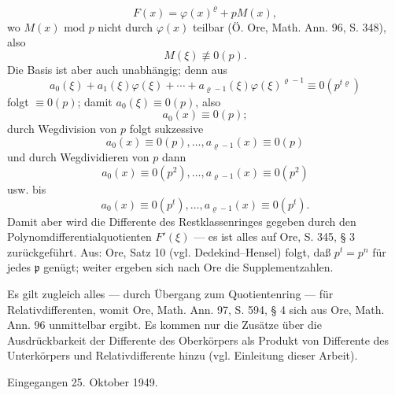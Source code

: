 \[
F(x)=\varphi(x)^\varrho+pM(x),
\]
wo $M(x)$ mod $p$ nicht durch $\varphi(x)$ teilbar (Ö. Ore, Math. Ann. 96, S. 348), also
\[
M(\xi)\not\equiv0(p).
\]
Die Basis ist aber auch unabhängig; denn aus
\[
a_0(\xi)+a_1(\xi)\varphi(\xi)+\cdots+a_{\varrho-1}(\xi)\varphi(\xi)^{\varrho-1}
\equiv0(p^{t\varrho})
\]
folgt $\equiv0(p)$; damit $a_0(\xi)\equiv0(p)$, also
\[
a_0(x)\equiv0(p);
\]
durch Wegdivision von $p$ folgt sukzessive
\[
a_0(x)\equiv0(p),\ldots,a_{\varrho-1}(x)\equiv0(p)
\]
und durch Wegdividieren von $p$ dann
\[
a_0(x)\equiv0(p^2),\ldots,a_{\varrho-1}(x)\equiv0(p^2)
\]
usw. bis
\[
a_0(x)\equiv0(p^t),\ldots,a_{\varrho-1}(x)\equiv0(p^t).
\]
Damit aber wird die Differente des Restklassenringes gegeben durch den Polynomdifferentialquotienten $F'(\xi)$ --- es ist alles auf Ore, S. 345, § 3 zurückgeführt. Aus: Ore, Satz 10 (vgl. Dedekind--Hensel) folgt, daß $p^t=p^n$ für jedes $\mathfrak p$ genügt; weiter ergeben sich nach Ore die Supplementzahlen.

Es gilt zugleich alles --- durch Übergang zum Quotientenring --- für Relativdifferenten, womit Ore, Math. Ann. 97, S. 594, § 4 sich aus Ore, Math. Ann. 96 unmittelbar ergibt. Es kommen nur die Zusätze über die Ausdrückbarkeit der Differente des Oberkörpers als Produkt von Differente des Unterkörpers und Relativdifferente hinzu (vgl. Einleitung dieser Arbeit).

\begin{center}
Eingegangen 25. Oktober 1949.
\end{center}



